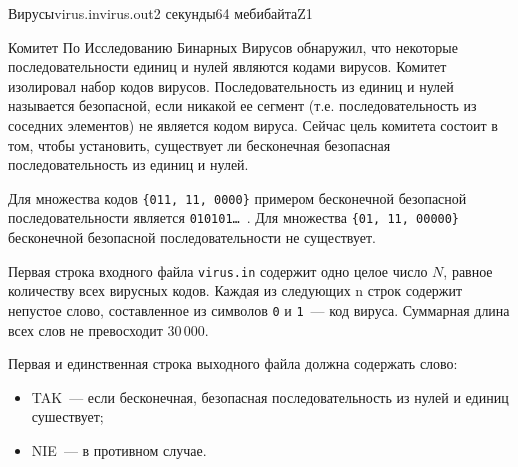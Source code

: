 \begin{problem}{Вирусы}{virus.in}{virus.out}{2 секунды}{64 мебибайта}{Z1}

Комитет По Исследованию Бинарных Вирусов обнаружил, что некоторые
последовательности единиц и нулей являются кодами вирусов. Комитет
изолировал набор кодов вирусов. Последовательность из единиц
и нулей называется безопасной, если никакой ее сегмент (т.е. последовательность
из соседних элементов) не является кодом вируса. Сейчас цель комитета
состоит в том, чтобы установить, существует ли бесконечная безопасная
последовательность из единиц и нулей.

\Example

Для множества кодов \texttt{\{011, 11, 0000\}} примером бесконечной безопасной
последовательности является \texttt{010101\ldots}~. Для множества \texttt{\{01, 11, 00000\}}
бесконечной безопасной последовательности не существует.

\InputFile

Первая строка входного файла \texttt{virus.in} содержит одно целое число $N$, равное
количеству всех вирусных кодов. Каждая из следующих n строк
содержит непустое слово, составленное из символов \texttt{0} и \texttt{1}~--- код вируса.
Суммарная длина всех слов не превосходит $30\,000$.

\OutputFile

Первая и единственная строка выходного файла должна содержать слово:
\begin{itemize}
\item TAK~--- если бесконечная, безопасная последовательность из нулей
и единиц сушествует;
\item NIE~--- в противном случае.
\end{itemize}

\Example

\begin{example}
%
%
\end{example}

\end{problem}

